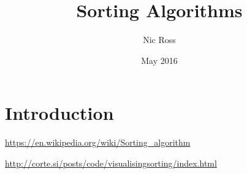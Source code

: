\documentclass{article}
\title{Sorting Algorithms}
\author{Nic Ross}
\date{May 2016}
\begin{document}
\maketitle

\section{Introduction}

\noindent
\href{https://en.wikipedia.org/wiki/Sorting\_algorithm}{https://en.wikipedia.org/wiki/Sorting\_algorithm}


\noindent
\href{http://corte.si/posts/code/visualisingsorting/index.html}{http://corte.si/posts/code/visualisingsorting/index.html}


\end{document}
